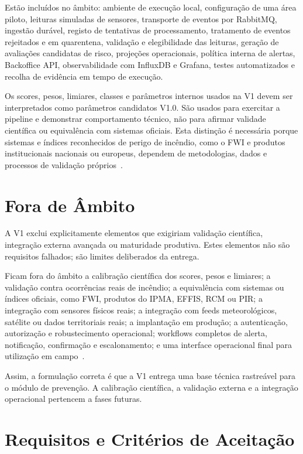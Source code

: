 Estão incluídos no âmbito: ambiente de execução local, configuração de uma área piloto, leituras simuladas de sensores, transporte de eventos por RabbitMQ, ingestão durável, registo de tentativas de processamento, tratamento de eventos rejeitados e em quarentena, validação e elegibilidade das leituras, geração de avaliações candidatas de risco, projeções operacionais, política interna de alertas, Backoffice API, observabilidade com InfluxDB e Grafana, testes automatizados e recolha de evidência em tempo de execução.

Os scores, pesos, limiares, classes e parâmetros internos usados na V1 devem ser interpretados como parâmetros candidatos V1.0. São usados para exercitar a pipeline e demonstrar comportamento técnico, não para afirmar validade científica ou equivalência com sistemas oficiais. Esta distinção é necessária porque sistemas e índices reconhecidos de perigo de incêndio, como o FWI e produtos institucionais nacionais ou europeus, dependem de metodologias, dados e processos de validação próprios~\citep{nrcan_fwi_system,ipma_fwi,ipma_pir_rcm,ec_jrc_effis}.

\section{Fora de Âmbito}

A V1 exclui explicitamente elementos que exigiriam validação científica, integração externa avançada ou maturidade produtiva. Estes elementos não são requisitos falhados; são limites deliberados da entrega.

Ficam fora do âmbito a calibração científica dos scores, pesos e limiares; a validação contra ocorrências reais de incêndio; a equivalência com sistemas ou índices oficiais, como FWI, produtos do IPMA, EFFIS, RCM ou PIR; a integração com sensores físicos reais; a integração com feeds meteorológicos, satélite ou dados territoriais reais; a implantação em produção; a autenticação, autorização e robustecimento operacional; workflows completos de alerta, notificação, confirmação e escalonamento; e uma interface operacional final para utilização em campo~\citep{nrcan_fwi_system,ipma_fwi,ipma_pir_rcm,copernicus_effis}.

Assim, a formulação correta é que a V1 entrega uma base técnica rastreável para o módulo de prevenção. A calibração científica, a validação externa e a integração operacional pertencem a fases futuras.

\section{Requisitos e Critérios de Aceitação}

